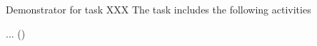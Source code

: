 \begin{task}[
  title=Teaching with Jupyter technology,
  id=teaching,
  lead=XXX,
  PM=4,
  wphases={0-48},
  partners={UPSUD,EP}
  ]

  Demonstrator for task XXX
  The task includes the following activities
  \begin{compactitem}
  \item ...
    ()
  \end{compactitem}
\end{task}

